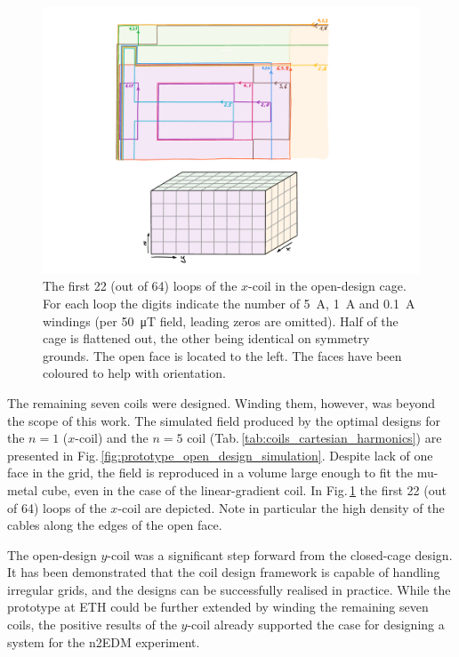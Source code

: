 \begin{figure}
  \centering
  \includegraphics[width=\linewidth]{gfx/prototype/open_design_Xcoil_coils.pdf}
  \caption{The first 22 (out of 64) loops of the $x$-coil in the open-design cage. For each loop the digits indicate the number of \SI{5}{\ampere}, \SI{1}{\ampere} and \SI{0.1}{\ampere} windings (per \SI{50}{\micro\tesla} field, leading zeros are omitted).
  Half of the cage is flattened out, the other being identical on symmetry grounds.
  The open face is located to the left. The faces have been coloured to help with orientation.}\label{fig:prototype_open_design_Xcoil_coils}
\end{figure}

The remaining seven coils were designed.
Winding them, however, was beyond the scope of this work.
The simulated field produced by the optimal designs for the $n = 1$ ($x$-coil) and the $n = 5$ coil (Tab.\,\ref{tab:coils_cartesian_harmonics}) are presented in Fig.\,\ref{fig:prototype_open_design_simulation}.
Despite lack of one face in the grid, the field is reproduced in a volume large enough to fit the mu-metal cube, even in the case of the linear-gradient coil.
In Fig.\,\ref{fig:prototype_open_design_Xcoil_coils} the first 22 (out of 64) loops of the $x$-coil are depicted.
Note in particular the high density of the cables along the edges of the open face.

The open-design $y$-coil was a significant step forward from the closed-cage design.
It has been demonstrated that the coil design framework is capable of handling irregular grids, and the designs can be successfully realised in practice.
While the prototype at ETH could be further extended by winding the remaining seven coils, the positive results of the $y$-coil already supported the case for designing a system for the n2EDM experiment.




